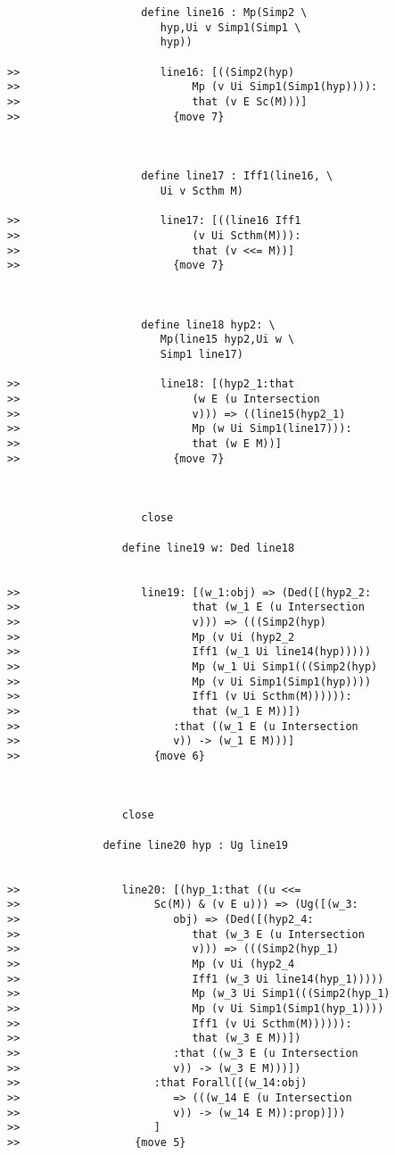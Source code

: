 \documentclass[12pt]{article}
\begin{document}
\begin{verbatim}
                     define line16 : Mp(Simp2 \
                        hyp,Ui v Simp1(Simp1 \
                        hyp))

>>                      line16: [((Simp2(hyp)
>>                           Mp (v Ui Simp1(Simp1(hyp)))):
>>                           that (v E Sc(M)))]
>>                        {move 7}



                     define line17 : Iff1(line16, \
                        Ui v Scthm M)

>>                      line17: [((line16 Iff1
>>                           (v Ui Scthm(M))):
>>                           that (v <<= M))]
>>                        {move 7}



                     define line18 hyp2: \
                        Mp(line15 hyp2,Ui w \
                        Simp1 line17)

>>                      line18: [(hyp2_1:that
>>                           (w E (u Intersection
>>                           v))) => ((line15(hyp2_1)
>>                           Mp (w Ui Simp1(line17))):
>>                           that (w E M))]
>>                        {move 7}



                     close

                  define line19 w: Ded line18


>>                   line19: [(w_1:obj) => (Ded([(hyp2_2:
>>                           that (w_1 E (u Intersection
>>                           v))) => (((Simp2(hyp)
>>                           Mp (v Ui (hyp2_2
>>                           Iff1 (w_1 Ui line14(hyp)))))
>>                           Mp (w_1 Ui Simp1(((Simp2(hyp)
>>                           Mp (v Ui Simp1(Simp1(hyp))))
>>                           Iff1 (v Ui Scthm(M)))))):
>>                           that (w_1 E M))])
>>                        :that ((w_1 E (u Intersection
>>                        v)) -> (w_1 E M)))]
>>                     {move 6}



                  close

               define line20 hyp : Ug line19


>>                line20: [(hyp_1:that ((u <<=
>>                     Sc(M)) & (v E u))) => (Ug([(w_3:
>>                        obj) => (Ded([(hyp2_4:
>>                           that (w_3 E (u Intersection
>>                           v))) => (((Simp2(hyp_1)
>>                           Mp (v Ui (hyp2_4
>>                           Iff1 (w_3 Ui line14(hyp_1)))))
>>                           Mp (w_3 Ui Simp1(((Simp2(hyp_1)
>>                           Mp (v Ui Simp1(Simp1(hyp_1))))
>>                           Iff1 (v Ui Scthm(M)))))):
>>                           that (w_3 E M))])
>>                        :that ((w_3 E (u Intersection
>>                        v)) -> (w_3 E M)))])
>>                     :that Forall([(w_14:obj)
>>                        => (((w_14 E (u Intersection
>>                        v)) -> (w_14 E M)):prop)]))
>>                     ]
>>                  {move 5}




\end{verbatim}
\end{document}
